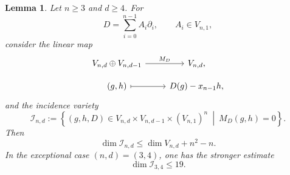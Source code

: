 \documentclass[10pt,a4paper]{amsart}
\numberwithin{equation}{section}
\theoremstyle{plain}
\newtheorem{lemma}[theorem]{Lemma}
\theoremstyle{definition}
\theoremstyle{plain}
\theoremstyle{definition}
\begin{document}
\setcounter{section}{3}
\setcounter{theorem}{2}
\begin{lemma}\label{lem:incidence-bound}
Let \(n\ge3\) and \(d\ge4\). For
\[
D=\sum_{i=0}^{n-1}A_i\partial_i,
\qquad A_i\in V_{n,1},
\]
consider the linear map
\[
\begin{tikzcd}[row sep=small]
V_{n,d}\oplus V_{n,d-1}
  \arrow[r,"M_D"]
& V_{n,d},\\
(g,h)\arrow[r,mapsto]
&D(g)-x_{n-1}h,
\end{tikzcd}
\]
and the  incidence variety
\[
\mathcal I_{n,d}:=
\left\{
(g,h,D)\in
V_{n,d}\times V_{n,d-1}\times(V_{n,1})^n
\ \middle|\ M_D(g,h)=0
\right\}.
\]
Then
\[
\dim\mathcal I_{n,d}\le \dim V_{n,d}+n^2-n.
\tag{1}\label{eq:I-general-bound}
\]
In the exceptional case \((n,d)=(3,4)\), one has the stronger estimate
\[
\dim\mathcal I_{3,4}\le19.
\tag{2}\label{eq:I-exceptional-bound}
\]
\end{lemma}
\end{document}
